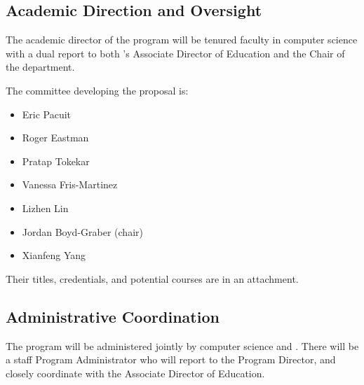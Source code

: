 
\subsection{Academic Direction and Oversight}

The academic director of the program will be tenured faculty in computer
science with a dual report to both \aim{}'s Associate Director of
Education and the Chair of the  department.

The committee developing the proposal is:
\begin{itemize}
    \item Eric Pacuit
    \item Roger Eastman
    \item Pratap Tokekar
    \item Vanessa Fris-Martinez
    \item Lizhen Lin
    \item Jordan Boyd-Graber (chair)
    \item Xianfeng Yang
\end{itemize}

Their titles, credentials, and potential courses are in an attachment.

\subsection{Administrative Coordination}


The program will be administered jointly by computer science and \aim{}. There will be a staff Program Administrator who will report to the Program Director, and closely coordinate with the \aim{} Associate Director of Education.